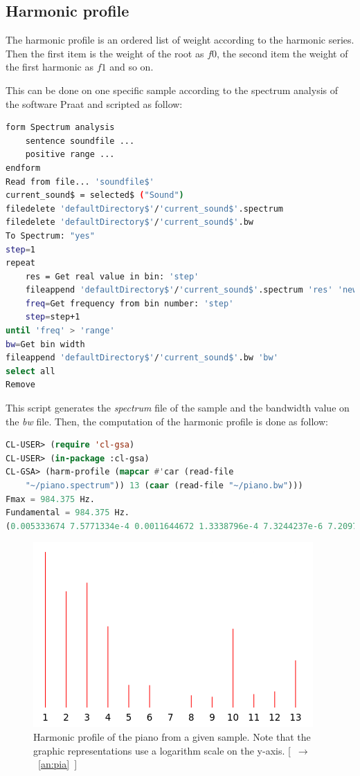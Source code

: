 \subsection{Harmonic profile}

The harmonic profile is an ordered list of weight according to the harmonic series. Then the first item is the weight of the root as $f0$, the second item the weight of the first harmonic as $f1$ and so on.

This can be done on one specific sample according to the spectrum analysis of the software Praat and scripted as follow:

\begin{lstlisting}[language=bash]
form Spectrum analysis
    sentence soundfile ...
    positive range ...
endform
Read from file... 'soundfile$'
current_sound$ = selected$ ("Sound")
filedelete 'defaultDirectory$'/'current_sound$'.spectrum
filedelete 'defaultDirectory$'/'current_sound$'.bw
To Spectrum: "yes"  
step=1
repeat 
    res = Get real value in bin: 'step'
    fileappend 'defaultDirectory$'/'current_sound$'.spectrum 'res' 'newline$'
    freq=Get frequency from bin number: 'step'
    step=step+1
until 'freq' > 'range' 	
bw=Get bin width
fileappend 'defaultDirectory$'/'current_sound$'.bw 'bw' 
select all
Remove
\end{lstlisting}

This script generates the \textsl{spectrum} file of the sample and the bandwidth value on the \textsl{bw} file.
Then, the computation of the harmonic profile is done as follow:

\begin{lstlisting}[language=Lisp]
CL-USER> (require 'cl-gsa)
CL-USER> (in-package :cl-gsa)
CL-GSA> (harm-profile (mapcar #'car (read-file 
    "~/piano.spectrum")) 13 (caar (read-file "~/piano.bw")))
Fmax = 984.375 Hz.
Fundamental = 984.375 Hz.
(0.005333674 7.5771334e-4 0.0011644672 1.3338796e-4 7.3244237e-6 7.2097446e-6 2.3828345e-6 4.374403e-6 4.064216e-6 1.18368014e-4 4.6414575e-6 5.292382e-6 2.4746847e-5)

\end{lstlisting}

\begin{figure}[!hbt]
	\begin{center}
		\includegraphics[scale=0.5]{img/4509}
		\caption{Harmonic profile of the piano from a given sample. Note that the graphic representations use a logarithm scale on the y-axis. \mbox{[ $\rightarrow$ \ref{an:pia} ]}}
		\label{fig:piano}
	\end{center}
\end{figure}

